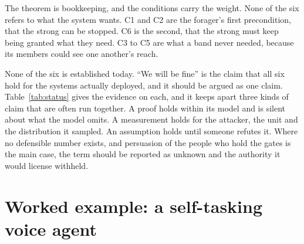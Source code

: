 \documentclass[10pt,twocolumn]{article}
\theoremstyle{plain}
\theoremstyle{definition}
\begin{document}
The theorem is bookkeeping, and the conditions carry the weight. None of the six refers to
what the system wants. C1 and C2 are the forager's first precondition, that the strong can be
stopped. C6 is the second, that the strong must keep being granted what they need. C3 to C5
are what a band never needed, because its members could see one another's reach.

None of the six is established today. ``We will be fine'' is the claim that all six hold for
the systems actually deployed, and it should be argued as one claim.
Table~\ref{tab:status} gives the evidence on each, and it keeps apart three kinds of claim
that are often run together. A proof holds within its model and is silent about what the
model omits. A measurement holds for the attacker, the unit and the distribution it sampled.
An assumption holds until someone refutes it. Where no defensible number exists, and
persuasion of the people who hold the gates is the main case, the term should be reported as
unknown and the authority it would license withheld.

\section{Worked example: a self-tasking voice agent}\label{sec:example}
\end{document}
